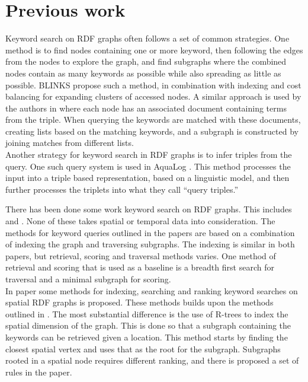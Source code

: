 \section{Previous work}
Keyword search on RDF graphs often follows a set of common strategies. One method is to find nodes containing one or more keyword, then following the edges from the nodes to explore the graph, and find subgraphs where the combined nodes contain as many keywords as possible while also spreading as little as possible. BLINKS \cite{blinks} propose such a method, in combination with indexing and cost balancing for expanding clusters of accessed nodes. A similar approach is used by the authors in \cite{Elbassuoni:2011:KSO:2063576.2063615} where each node has an associated document containing terms from the triple. When querying the keywords are matched with these documents, creating lists based on the matching keywords, and a subgraph is constructed by joining matches from different lists.\\

Another strategy for keyword search in RDF graphs is to infer triples from the query. One such query system is used in AquaLog \cite{aqualog}. This method processes the input into a triple based representation, based on a linguistic model, and then further processes the triplets into what they call ``query triples.''



There has been done some work keyword search on RDF graphs. This includes \cite{4812421} and \cite{Elbassuoni:2011:KSO:2063576.2063615}. None of these takes spatial or temporal data into consideration. The methods for keyword queries outlined in the papers are based on a combination of indexing the graph and traversing subgraphs. The indexing is similar in both papers, but retrieval, scoring and traversal methods varies. One method of retrieval and scoring that is used as a baseline is a breadth first search for traversal and a minimal subgraph for scoring.\\

In paper \cite{Shi:2016:TRS:2882903.2882941} some methods for indexing, searching and ranking keyword searches on spatial RDF graphs is proposed. These methods builds upon the methods outlined in \cite{4812421, Elbassuoni:2011:KSO:2063576.2063615}. The most substantial difference is the use of R-trees to index the spatial dimension of the graph. This is done so that a subgraph containing the keywords can be retrieved given a location. This method starts by finding the closest spatial vertex and uses that as the root for the subgraph. Subgraphs rooted in a spatial node requires different ranking, and there is proposed a set of rules in the paper.\\


